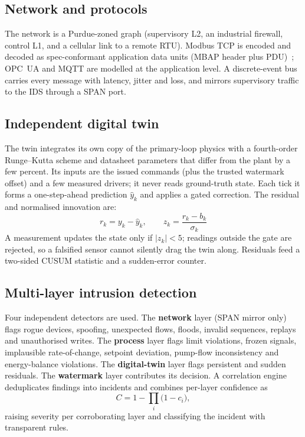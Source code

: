 \documentclass[11pt,a4paper]{article}
\begin{document}
\subsection{Network and protocols}
The network is a Purdue-zoned graph (supervisory L2, an industrial firewall, control L1, and a cellular link to a remote RTU). Modbus TCP is encoded and decoded as spec-conformant application data units (MBAP header plus PDU)~\cite{modbus}; OPC~UA and MQTT are modelled at the application level. A discrete-event bus carries every message with latency, jitter and loss, and mirrors supervisory traffic to the IDS through a SPAN port.

\subsection{Independent digital twin}
The twin integrates its own copy of the primary-loop physics with a fourth-order Runge--Kutta scheme and datasheet parameters that differ from the plant by a few percent. Its inputs are the issued commands (plus the trusted watermark offset) and a few measured drivers; it never reads ground-truth state. Each tick it forms a one-step-ahead prediction $\hat{y}_k$ and applies a gated correction. The residual and normalised innovation are:
\begin{equation}
r_k=y_k-\hat{y}_k,\qquad z_k=\frac{r_k-b_k}{\sigma_k}
\end{equation}
A measurement updates the state only if $|z_k|<5$; readings outside the gate are rejected, so a falsified sensor cannot silently drag the twin along. Residuals feed a two-sided CUSUM statistic and a sudden-error counter.

\subsection{Multi-layer intrusion detection}
Four independent detectors are used. The \textbf{network} layer (SPAN mirror only) flags rogue devices, spoofing, unexpected flows, floods, invalid sequences, replays and unauthorised writes. The \textbf{process} layer flags limit violations, frozen signals, implausible rate-of-change, setpoint deviation, pump-flow inconsistency and energy-balance violations. The \textbf{digital-twin} layer flags persistent and sudden residuals. The \textbf{watermark} layer contributes its decision. A correlation engine deduplicates findings into incidents and combines per-layer confidence as
\begin{equation}
C=1-\prod_{i}\bigl(1-c_i\bigr),
\end{equation}
raising severity per corroborating layer and classifying the incident with transparent rules.
\end{document}
